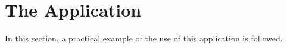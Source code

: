 \section{The Application}

In this section, a practical example of the use of this application is followed.


